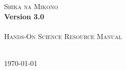 \begin{titlepage}
\begin{center}
	\textsc{{\Huge Shika na Mikono}}\\[0.4cm]
	\textbf{{\huge Version 3.0}}\\[1.5cm]
	\HRule\\[0.4cm]
	\textsc{{\Large Hands-On Science Resource Manual}}\\[0.4cm]
	\HRule\\[0.5cm]
\end{center}

\vfill
\begin{center}
	{\large \today}
\end{center}
\end{titlepage}
